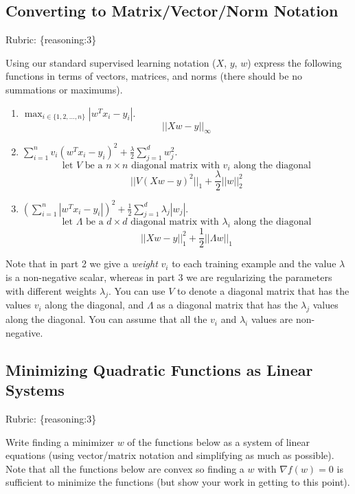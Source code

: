 \documentclass{article}
\def\rubric#1{\gre{Rubric: \{#1\}}}{}
\def\blu#1{{\color{blu}#1}}
\def\gre#1{{\color{gre}#1}}
\def\red#1{{\color{red}#1}}
\def\ans#1{{\color{ans}#1}}
\def\half{\frac 1 2}
\def\enum#1{\begin{enumerate}#1\end{enumerate}}
\begin{document}
\subsection{Converting to Matrix/Vector/Norm Notation}
\rubric{reasoning:3}

Using our standard supervised learning notation ($X$, $y$, $w$)
express the following functions in terms of vectors, matrices, and norms (there should be no summations or maximums).
\blu{\enum{
\item $\max_{i \in \{1,2,\dots,n\}}  |w^Tx_i - y_i|$. \\
\ans{
    \[
        ||Xw - y||_{\infty}
    \]
}
\item $\sum_{i=1}^n v_i(w^Tx_i  - y_i)^2 + \frac{\lambda}{2}\sum_{j=1}^d w_j^2$.
\ans{
    \[
        \text{let } V  \text{ be a } n \times n \text{ diagonal matrix with } v_i \text{ along the diagonal}
    \]
    \[
        || V (Xw  - y)^2 ||_1 + \frac{\lambda}{2} || w ||_2^2
    \]
}
\item $\left(\sum_{i=1}^n |w^Tx_i - y_i|\right)^2 +  \half\sum_{j=1}^{d} \lambda_j|w_j|$.
\ans{
    \[
        \text{let } \Lambda  \text{ be a } d \times d \text{ diagonal matrix with } \lambda_i \text{ along the diagonal}
    \]
    \[
        ||Xw - y||_{1}^2 + \half ||\Lambda w||_1
    \]
}
}}
Note that in part 2 we give a \emph{weight} $v_i$ to each training example \red{and the value $\lambda$ is a non-negative scalar}, whereas in part 3 we are regularizing the parameters with different weights $\lambda_j$.
You can use $V$ to denote a diagonal matrix that has the values $v_i$ along the diagonal, and $\Lambda$ as a diagonal matrix that has the $\lambda_j$ values along the diagonal. You can assume that all the $v_i$ and $\lambda_i$ values are non-negative. 

\subsection{Minimizing Quadratic Functions as Linear Systems}
\rubric{reasoning:3}

Write finding a minimizer $w$ of the functions below as a system of linear equations (using vector/matrix notation and simplifying as much as possible). Note that all the functions below are convex  so finding a $w$ with $\nabla f(w) = 0$ is sufficient to minimize the functions (but show your work in getting to this point).
\end{document}
